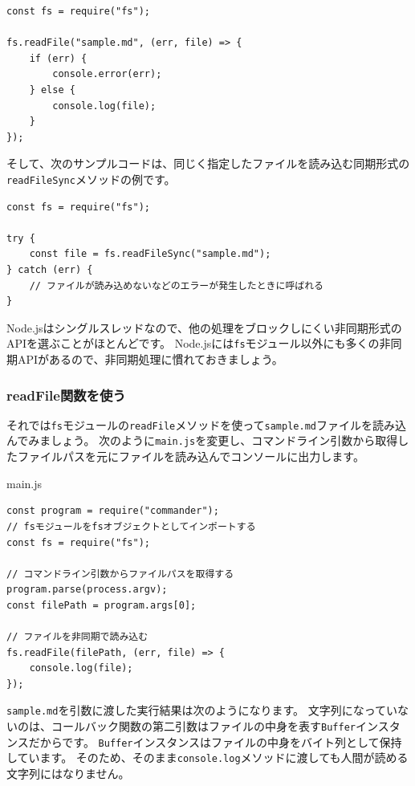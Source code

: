 \begin{lstlisting}
const fs = require("fs");

fs.readFile("sample.md", (err, file) => {
    if (err) {
        console.error(err);
    } else {
        console.log(file);
    }
});
\end{lstlisting}

そして、次のサンプルコードは、同じく指定したファイルを読み込む同期形式の\texttt{readFileSync}メソッドの例です。

\begin{lstlisting}
const fs = require("fs");

try {
    const file = fs.readFileSync("sample.md");
} catch (err) { 
    // ファイルが読み込めないなどのエラーが発生したときに呼ばれる
}
\end{lstlisting}

Node.jsはシングルスレッドなので、他の処理をブロックしにくい非同期形式のAPIを選ぶことがほとんどです。
Node.jsには\texttt{fs}モジュール以外にも多くの非同期APIがあるので、非同期処理に慣れておきましょう。

\hypertarget{use-readFile}{%
\subsubsection{readFile関数を使う}\label{use-readFile}}

それでは\texttt{fs}モジュールの\texttt{readFile}メソッドを使って\texttt{sample.md}ファイルを読み込んでみましょう。
次のように\texttt{main.js}を変更し、コマンドライン引数から取得したファイルパスを元にファイルを読み込んでコンソールに出力します。

\begin{listtitle}
main.js
\end{listtitle}
\begin{lstlisting}
const program = require("commander");
// fsモジュールをfsオブジェクトとしてインポートする
const fs = require("fs");

// コマンドライン引数からファイルパスを取得する
program.parse(process.argv);
const filePath = program.args[0];

// ファイルを非同期で読み込む
fs.readFile(filePath, (err, file) => {
    console.log(file);
});
\end{lstlisting}
\listend

\texttt{sample.md}を引数に渡した実行結果は次のようになります。
文字列になっていないのは、コールバック関数の第二引数はファイルの中身を表す\texttt{Buffer}インスタンスだからです。
\texttt{Buffer}インスタンスはファイルの中身をバイト列として保持しています。
そのため、そのまま\texttt{console.log}メソッドに渡しても人間が読める文字列にはなりません。

